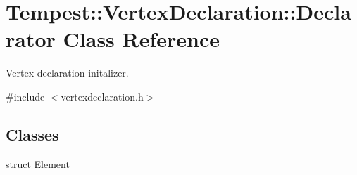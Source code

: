 \hypertarget{class_tempest_1_1_vertex_declaration_1_1_declarator}{\section{Tempest\+:\+:Vertex\+Declaration\+:\+:Declarator Class Reference}
\label{class_tempest_1_1_vertex_declaration_1_1_declarator}
}


Vertex declaration initalizer.  




{\ttfamily \#include $<$vertexdeclaration.\+h$>$}

\subsection*{Classes}
\begin{DoxyCompactItemize}
\item 
struct \hyperlink{struct_tempest_1_1_vertex_declaration_1_1_declarator_1_1_element}{Element}
\end{DoxyCompactItemize}
